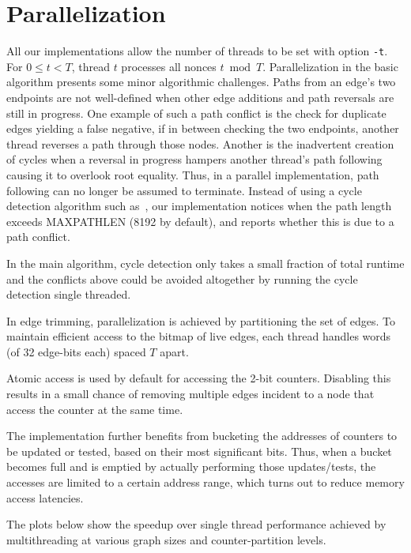 \documentclass{beamer}
\begin{document}
\section{Parallelization}
All our implementations allow the number of threads to be set with option {\tt -t}.
For $0\leq t < T$, thread $t$ processes all nonces $t \bmod T$.
Parallelization in the basic algorithm presents some minor algorithmic challenges.
Paths from an edge's two endpoints
are not well-defined when other edge additions and path reversals are still in progress.
One example of such a path conflict is the check for duplicate edges yielding a false negative,
if in between checking the two endpoints, another thread reverses a path through those nodes.
Another is the inadvertent creation of cycles when a reversal in progress hampers another thread's
path following causing it to overlook root equality.
Thus, in a parallel implementation, path following can no longer be assumed to terminate.
Instead of using a cycle detection algorithm such as~\cite{1980-brent-cycles}, our implementation
notices when the path length exceeds MAXPATHLEN (8192 by default),
and reports whether this is due to a path conflict.

In the main algorithm, cycle detection only takes a small fraction of total runtime and
the conflicts above could be avoided altogether by running the cycle detection single threaded.

In edge trimming, parallelization is achieved by partitioning the set of edges. To maintain efficient access
to the bitmap of live edges, each thread handles words (of 32 edge-bits each) spaced $T$ apart.

Atomic access is used by default for accessing the 2-bit counters. Disabling this results in a small
chance of removing multiple edges incident to a node that access the counter at the same time.

The implementation further benefits from bucketing the addresses of counters to be updated or tested,
based on their most significant bits. Thus, when a bucket becomes full and is emptied by actually
performing those updates/tests, the accesses are limited to a certain address range, which turns
out to reduce memory access latencies.

The plots below show the speedup over single thread performance achieved by multithreading at various
graph sizes and counter-partition levels.
\end{document}
